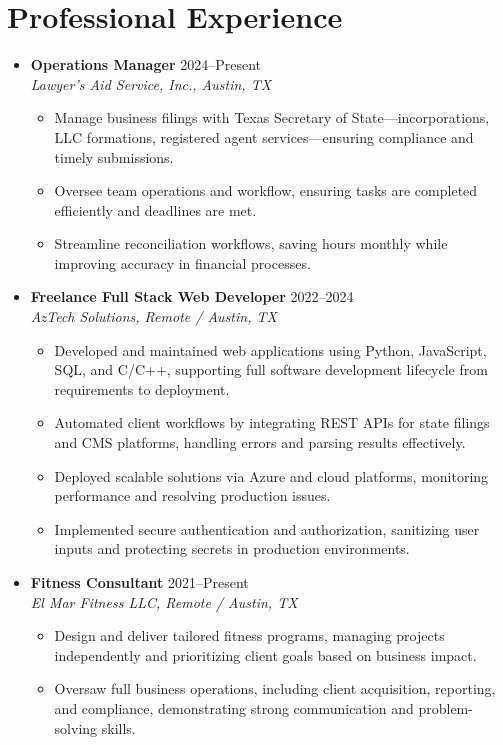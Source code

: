 \documentclass[letterpaper,10pt]{article}
\newcommand{\resumeItem}[1]{\item \small{#1}}
\begin{document}
\section*{Professional Experience}
\begin{itemize}
  \item[]
    \textbf{Operations Manager} \hfill 2024--Present \\
    \textit{Lawyer's Aid Service, Inc., Austin, TX}
  \begin{itemize}
    \resumeItem{Manage business filings with Texas Secretary of State---incorporations, LLC formations, registered agent services---ensuring compliance and timely submissions.}
    \resumeItem{Oversee team operations and workflow, ensuring tasks are completed efficiently and deadlines are met.}
    \resumeItem{Streamline reconciliation workflows, saving hours monthly while improving accuracy in financial processes.}
  \end{itemize}

  \item[]
    \textbf{Freelance Full Stack Web Developer} \hfill 2022--2024 \\
    \textit{AzTech Solutions, Remote / Austin, TX}
  \begin{itemize}
    \resumeItem{Developed and maintained web applications using Python, JavaScript, SQL, and C/C++, supporting full software development lifecycle from requirements to deployment.}
    \resumeItem{Automated client workflows by integrating REST APIs for state filings and CMS platforms, handling errors and parsing results effectively.}
    \resumeItem{Deployed scalable solutions via Azure and cloud platforms, monitoring performance and resolving production issues.}
    \resumeItem{Implemented secure authentication and authorization, sanitizing user inputs and protecting secrets in production environments.}
  \end{itemize}

  \item[]
    \textbf{Fitness Consultant} \hfill 2021--Present \\
    \textit{El Mar Fitness LLC, Remote / Austin, TX}
  \begin{itemize}
    \resumeItem{Design and deliver tailored fitness programs, managing projects independently and prioritizing client goals based on business impact.}
    \resumeItem{Oversaw full business operations, including client acquisition, reporting, and compliance, demonstrating strong communication and problem-solving skills.}
  \end{itemize}
\end{itemize}
\end{document}
